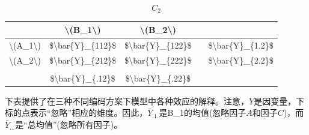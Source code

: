 \documentclass[
]{book}
\begin{document}
\[C_2\]

\begin{table}
\centering
\begin{tabular}{c|c|c|c|c}
\hline
 & \textbackslash{}(B\_1\textbackslash{}) & \textbackslash{}(B\_2\textbackslash{}) &  & \\
\hline
\textbackslash{}(A\_1\textbackslash{}) & \$\textbackslash{}bar\{Y\}\_\{112\}\$ & \$\textbackslash{}bar\{Y\}\_\{122\}\$ &  & \$\textbackslash{}bar\{Y\}\_\{1.2\}\$\\
\hline
\textbackslash{}(A\_2\textbackslash{}) & \$\textbackslash{}bar\{Y\}\_\{212\}\$ & \$\textbackslash{}bar\{Y\}\_\{222\}\$ &  & \$\textbackslash{}bar\{Y\}\_\{2.2\}\$\\
\hline
 &  &  &  & \\
\hline
 & \$\textbackslash{}bar\{Y\}\_\{.12\}\$ & \$\textbackslash{}bar\{Y\}\_\{.22\}\$ &  & \\
\hline
\end{tabular}
\end{table}

下表提供了在三种不同编码方案下模型中各种效应的解释。注意，\(Y\)是因变量，下标的点表示``忽略''相应的维度。因此，\(\bar{Y}_{.1.}\)是B\_1的均值(忽略因子\(A\)和因子\(C\))，而\(\bar{Y}_{...}\)是``总均值''(忽略所有因子)。
\end{document}
